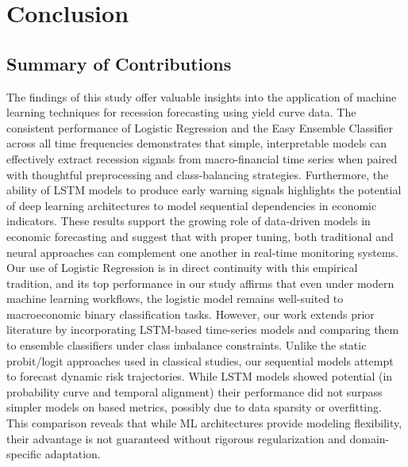 
\section{Conclusion}

\begin{comment}
\begin{itemize}
    \item \hlgreen{Summary of Contributions: Recap the main contributions of your project to the field.}
    \item \hlgreen{Future Work: Suggest areas for future research or further development of your project.}
    \item \hlgreen{Takeaways: Highlight the key lessons or findings from your work.}
\end{itemize}
\end{comment}







\subsection{Summary of Contributions}

The findings of this study offer valuable insights into the application of machine learning techniques for recession forecasting using yield curve data. The consistent performance of Logistic Regression and the Easy Ensemble Classifier across all time frequencies demonstrates that simple, interpretable models can effectively extract recession signals from macro-financial time series when paired with thoughtful preprocessing and class-balancing strategies. Furthermore, the ability of LSTM models to produce early warning signals highlights the potential of deep learning architectures to model sequential dependencies in economic indicators. 
These results support the growing role of data-driven models in economic forecasting and suggest that with proper tuning, both traditional and neural approaches can complement one another in real-time monitoring systems. Our use of Logistic Regression is in direct continuity with this empirical tradition, and its top performance in our study affirms that even under modern machine learning workflows, the logistic model remains well-suited to macroeconomic binary classification tasks. However, our work extends prior literature by incorporating LSTM-based time-series models and comparing them to ensemble classifiers under class imbalance constraints. Unlike the static probit/logit approaches used in classical studies, our sequential models attempt to forecast dynamic risk trajectories. While LSTM models showed potential (in probability curve and temporal alignment) their performance did not surpass simpler models on \AUCtwo based metrics, possibly due to data sparsity or overfitting. This comparison reveals that while ML architectures provide modeling flexibility, their advantage is not guaranteed without rigorous regularization and domain-specific adaptation.



